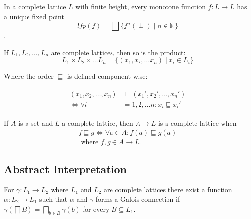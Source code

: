 \begin{theorem}\label{thm:kleene_finite}
    In a complete lattice $L$ with finite height, every monotone function $f : L \rightarrow L$ has a unique fixed point
    \begin{equation*}
        lfp(f) = \bigsqcup\{f^n(\perp) \mid n \in \mathbb{N}\}
    \end{equation*}.
\end{theorem}

\begin{theorem}
    If $L_1, L_2, \dots, L_n$ are complete lattices, then so is the product:
    \begin{equation*}
        L_1 \times L_2 \times \dots L_n = \{(x_1, x_2, \dots x_n) \mid x_i \in L_i\}
    \end{equation*}

    Where the order $\sqsubseteq$ is defined component-wise:

    \begin{align*}
        \begin{split}
        (x_1, x_2, \dots, x_n) &\sqsubseteq (x_1', x_2', \dots, x_n') \\
        \iff
        \forall i &= 1, 2, \dots n : x_i \sqsubseteq x_i'
        \end{split}
    \end{align*}
\end{theorem}

\begin{theorem}
    If $A$ is a set and $L$ a complete lattice, then $A \rightarrow L$ is a complete lattice when
    \begin{equation}
    \begin{split}
        f \sqsubseteq g \iff \forall a \in A : f(a) \sqsubseteq g(a) \\ \text{ where } f,g \in A \rightarrow L.\label{eq:equation-complete-lattice-theorem}
    \end{split}
    \end{equation}
\end{theorem}


\subsection{Abstract Interpretation}\label{subsec:abstract-interpretation}

\begin{theorem}\label{thm:galoispre}
    For $\gamma : L_1 \rightarrow L_2$ where $L_1$ and $L_2$ are complete lattices there exist a function $\alpha : L_2 \rightarrow L_1$ such that $\alpha$ and $\gamma$ forms a Galois connection if $\gamma\left(\bigsqcap B\right) = \bigsqcap_{b \in B}\gamma(b)$ for every $B \subseteq L_1$.
\end{theorem}

